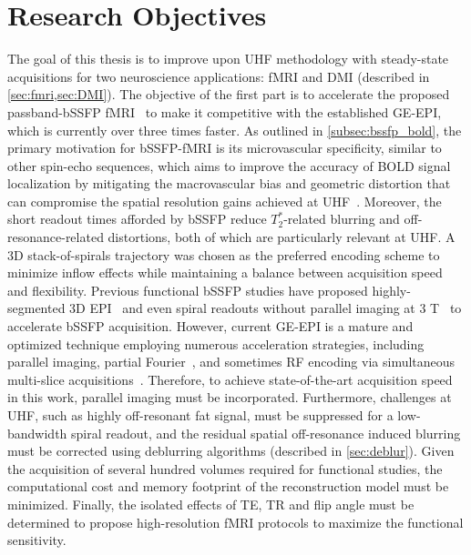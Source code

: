\newpage
\section{Research Objectives}
\label{sec:researchObj}
\vspace{-0.1cm}
The goal of this thesis is to improve upon \gls{UHF} methodology with steady-state acquisitions for two neuroscience applications: \gls{fMRI} and \gls{DMI} (described in \cref{sec:fmri,sec:DMI}). The objective of the first part is to accelerate the proposed passband-\gls{bSSFP} \gls{fMRI}~\cite{bowenHighFieldBalancedSSFP2005,schefflerHighresolutionMappingNeuronal2016} to make it competitive with the established \gls{GE}-\gls{EPI}, which is currently over three times faster. As outlined in \cref{subsec:bssfp_bold}, the primary motivation for \gls{bSSFP}-\gls{fMRI} is its microvascular specificity, similar to other spin-echo sequences, which aims to improve the accuracy of \gls{BOLD} signal localization by mitigating the macrovascular bias and geometric distortion that can compromise the spatial resolution gains achieved at \gls{UHF}~\cite{baez-yanezImpactVesselSize2017,schefflerBOLDSensitivityRapid2019}. Moreover, the short readout times afforded by \gls{bSSFP} reduce $T_2^*$-related blurring and off-resonance-related distortions, both of which are particularly relevant at \gls{UHF}. A 3D stack-of-spirals trajectory was chosen as the preferred encoding scheme to minimize inflow effects while maintaining a balance between acquisition speed and flexibility. Previous functional \gls{bSSFP} studies have proposed highly-segmented 3D EPI~\cite{ehsesMultilineBalancedSSFP2018,millerFMRIUsingBalanced2012} and even spiral readouts without parallel imaging at 3 T~\cite{leeFullbrainCoverageHighresolution2008} to accelerate bSSFP acquisition.  However, current \gls{GE}-\gls{EPI} is a mature and optimized technique employing numerous acceleration strategies, including parallel imaging, partial Fourier~\cite{stengerPartialFourierReconstruction1998}, and sometimes RF encoding via simultaneous multi-slice acquisitions~\cite{moellerMultibandMultisliceGEEPI2010}. Therefore, to achieve state-of-the-art acquisition speed in this work, parallel imaging must be incorporated.  Furthermore, challenges at \gls{UHF}, such as highly off-resonant fat signal, must be suppressed for a low-bandwidth spiral readout, and the residual spatial off-resonance induced blurring must be corrected using deblurring algorithms (described in \cref{sec:deblur}). Given the acquisition of several hundred volumes required for functional studies, the computational cost and memory footprint of the reconstruction model must be minimized. Finally, the isolated effects of \gls{TE}, \gls{TR} and flip angle must be determined to propose high-resolution \gls{fMRI} protocols to maximize the functional sensitivity.

